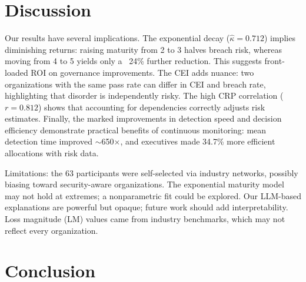 \documentclass[conference]{IEEEtran}
\begin{document}
\section{Discussion}
\label{sec:discussion}
Our results have several implications. The exponential decay ($\hat\kappa=0.712$) implies diminishing returns: raising maturity from 2 to 3 halves breach risk, whereas moving from 4 to 5 yields only a ~24\% further reduction. This suggests front-loaded ROI on governance improvements. The CEI adds nuance: two organizations with the same pass rate can differ in CEI and breach rate, highlighting that disorder is independently risky. The high CRP correlation ($r=0.812$) shows that accounting for dependencies correctly adjusts risk estimates. Finally, the marked improvements in detection speed and decision efficiency demonstrate practical benefits of continuous monitoring: mean detection time improved $\sim$650$\times$, and executives made 34.7\% more efficient allocations with risk data.

Limitations: the 63 participants were self-selected via industry networks, possibly biasing toward security-aware organizations. The exponential maturity model may not hold at extremes; a nonparametric fit could be explored. Our LLM-based explanations are powerful but opaque; future work should add interpretability. Loss magnitude (LM) values came from industry benchmarks, which may not reflect every organization.

\section{Conclusion}
\label{sec:conclusion}
\end{document}
